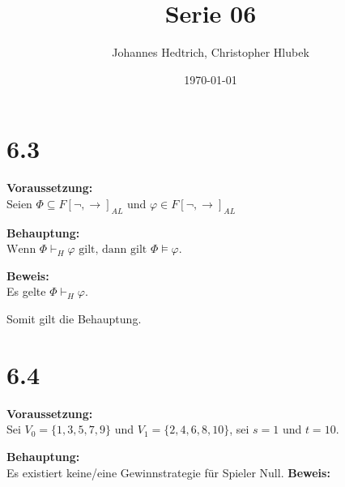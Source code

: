 \documentclass[12pt,a4paper]{scrartcl}
\title{Serie 06}
\author{Johannes Hedtrich, Christopher Hlubek}
\date{\today}
\begin{document}
\section*{6.3}
\noindent
\textbf{Voraussetzung:}\\
Seien $\Phi \subseteq F[\neg, \rightarrow]_{AL}$ und $\varphi \in F[\neg, \rightarrow]_{AL}$

\noindent
\textbf{Behauptung:}\\ 
$\text{Wenn } \Phi \vdash_H \varphi \text{ gilt, dann gilt }\Phi \models \varphi$.

\noindent
\textbf{Beweis:}\\
Es gelte $\Phi \vdash_H \varphi$.

\noindent
Somit gilt die Behauptung.

\section*{6.4}

\textbf{Voraussetzung:}\\
Sei $V_0 = \{1,3,5,7,9\}$ und $V_1 = \{2,4,6,8,10\}$, sei $s = 1$ und $t = 10$.

\textbf{Behauptung:}\\ 
Es existiert keine/eine Gewinnstrategie für Spieler Null.
\noindent
\textbf{Beweis: }
\end{document}
